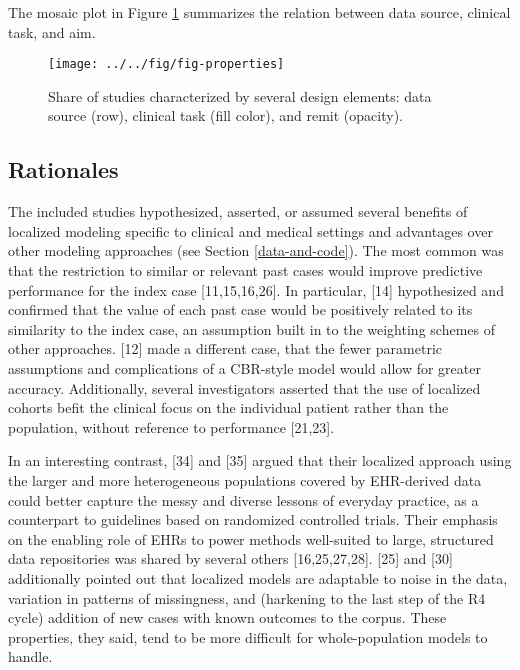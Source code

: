 \documentclass[preprint, 3p,
authoryear]{elsarticle} %
\begin{document}
The mosaic plot in Figure \ref{fig:properties} summarizes the relation
between data source, clinical task, and aim.

\begin{figure}

{\centering \texttt{[image: ../../fig/fig-properties]} 

}

\caption{Share of studies characterized by several design elements: data source (row), clinical task (fill color), and remit (opacity).}\label{fig:properties}
\end{figure}

\hypertarget{rationales}{%
\subsection{Rationales}\label{rationales}}

\label{rationales}

The included studies hypothesized, asserted, or assumed several benefits
of localized modeling specific to clinical and medical settings and
advantages over other modeling approaches (see Section
\ref{data-and-code}). The most common was that the restriction to
similar or relevant past cases would improve predictive performance for
the index case {[}11,15,16,26{]}. In particular, {[}14{]} hypothesized
and confirmed that the value of each past case would be positively
related to its similarity to the index case, an assumption built in to
the weighting schemes of other approaches. {[}12{]} made a different
case, that the fewer parametric assumptions and complications of a
CBR-style model would allow for greater accuracy. Additionally, several
investigators asserted that the use of localized cohorts befit the
clinical focus on the individual patient rather than the population,
without reference to performance {[}21,23{]}.

In an interesting contrast, {[}34{]} and {[}35{]} argued that their
localized approach using the larger and more heterogeneous populations
covered by EHR-derived data could better capture the messy and diverse
lessons of everyday practice, as a counterpart to guidelines based on
randomized controlled trials. Their emphasis on the enabling role of
EHRs to power methods well-suited to large, structured data repositories
was shared by several others {[}16,25,27,28{]}. {[}25{]} and {[}30{]}
additionally pointed out that localized models are adaptable to noise in
the data, variation in patterns of missingness, and (harkening to the
last step of the R4 cycle) addition of new cases with known outcomes to
the corpus. These properties, they said, tend to be more difficult for
whole-population models to handle.
\end{document}
